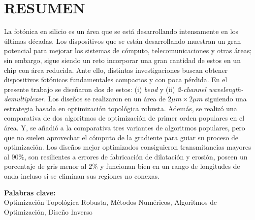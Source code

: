 \chapter*{\center \Large \vspace{-4.5cm} RESUMEN}

La fotónica en silicio es un área que se está desarrollando intensamente en los últimas décadas.
Los dispositivos que se están desarrollando muestran un gran potencial para mejorar
los sistemas de cómputo, telecomunicaciones y otras áreas;
sin embargo, sigue siendo un reto incorporar una gran cantidad de estos en un chip con área reducida.
Ante ello, distintas investigaciones buscan obtener dispositivos fotónicos fundamentales 
compactos y con poca pérdida. 
En el presente trabajo se diseñaron dos de estos: (i) \emph{bend} y (ii) \emph{2-channel wavelength-demultiplexer}.
Los diseños se realizaron en un área de $2 \mu m \times 2 \mu m$
siguiendo una estrategia basada en optimización topológica robusta.
Además, se realizó una comparativa de dos algoritmos de optimización de primer orden populares en el área.
Y, se añadió a la comparativa tres variantes de algoritmos populares, pero que no suelen
aprovechar el cómputo de la gradiente para guiar su proceso de optimización.
Los diseños mejor optimizados consiguieron transmitancias mayores al $90 \%$, son resilientes a errores
de fabricación de dilatación y erosión, poseen un porcentaje de gris menor al $2 \%$
y  funcionan bien en un rango de longitudes de onda incluso si se eliminan sus
regiones no conexas.

\noindent \textbf{Palabras clave:}\\
\noindent Optimización Topológica Robusta, Métodos Numéricos, Algoritmos de Optimización, Diseño Inverso
